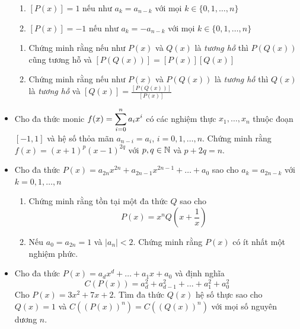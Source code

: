 \documentclass[11pt]{scrartcl}
\begin{document}
\begin{itemize}[label=, leftmargin=0em, itemsep=0.5em]
\begin{btvn}
\begin{enumerate}
                \item $[P(x)] = 1$ nếu như $a_k = a_{n - k}$ với mọi $k \in \{0,1,\dots,n\}$
                \item $[P(x)] = -1$ nếu như $a_k = -a_{n - k}$ với mọi $k \in \{0,1,\dots,n\}$
            \end{enumerate}
            \begin{enumerate}[label=(\alph*)]
                \item Chứng minh rằng nếu như $P(x)$ và $Q(x)$ là \textit{tương hỗ} thì $P(Q(x))$ cũng tương hỗ và $[P(Q(x))] = [P(x)][Q(x)]$
                \item Chứng minh rằng nếu như $P(x)$ và $P(Q(x))$ là \textit{tương hỗ} thì $Q(x)$ là \textit{tương hỗ} và $[Q(x)] = \frac{[P(Q(x))]}{[P(x)]}$
            \end{enumerate}
        \end{btvn} 
        \item \begin{btvn} Cho đa thức monic $f(x) = \displaystyle\sum_{i = 0}^n a_ix^i$ có các nghiệm thực $x_1,\dots,x_n$ thuộc đoạn $[-1,1]$ và hệ số thỏa mãn $a_{n - i} = a_i$, $i = 0,1,\dots,n$. Chứng minh rằng $f(x) = (x + 1)^p(x - 1)^{2q}$ với $p,q \in \mathbb{N}$ và $p + 2q = n$.
        \end{btvn}
        \item \begin{btvn} Cho đa thức $P(x) = a_{2n}x^{2n} + a_{2n - 1}x^{2n - 1} +\dots + a_0$ sao cho $a_k = a_{2n - k}$ với $k = 0,1,\dots,n$
        \begin{enumerate}[label=(\alph*)]
            \item Chứng minh rằng tồn tại một đa thức $Q$ sao cho 
            \[  
                P(x) = x^nQ\left(x + \frac{1}{x}\right)
            \]
            \item Nếu $a_0 = a_{2n} = 1$ và $|a_{n}| < 2$. Chứng minh rằng $P(x)$ có ít nhất một nghiệm phức.
        \end{enumerate}
        \end{btvn}
        \item \begin{btvn}
            Cho đa thức $P(x) = a_dx^d + \dots + a_1 x + a_0$ và định nghĩa
            \[
                C(P(x)) = a_d^2 + a_{d - 1}^2 + ... + a_1^2 + a_0^2
            \]
            Cho $P(x) = 3x^2 + 7x + 2$. Tìm đa thức $Q(x)$ hệ số thực sao cho $Q(x) = 1$ và $C((P(x))^n) = C((Q(x))^n)$ với mọi số nguyên dương $n$.
        \end{btvn}

\end{itemize}
\end{document}
